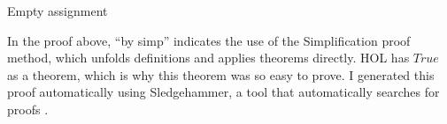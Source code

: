 \begin{isabellebody}
{  Empty assignment \color{black}%
}%
\endisatagproof
{\isafoldproof}%
%
\isadelimproof
%
\endisadelimproof
%
\begin{isamarkuptext}%
In the proof above, ``by simp'' indicates the use of the Simplification proof method, 
which unfolds definitions and applies theorems directly. HOL has $True$ as a theorem,
which is why this theorem was so easy to prove. I generated this proof automatically using Sledgehammer,
a tool that automatically searches for proofs \cite{sledgehammer}.%
\end{isamarkuptext}\isamarkuptrue%
%
\isadelimtheory
%
\endisadelimtheory
%
\isatagtheory
%
\endisatagtheory
{\isafoldtheory}%
%
\isadelimtheory
%
\endisadelimtheory
%
\end{isabellebody}%
\endinput
